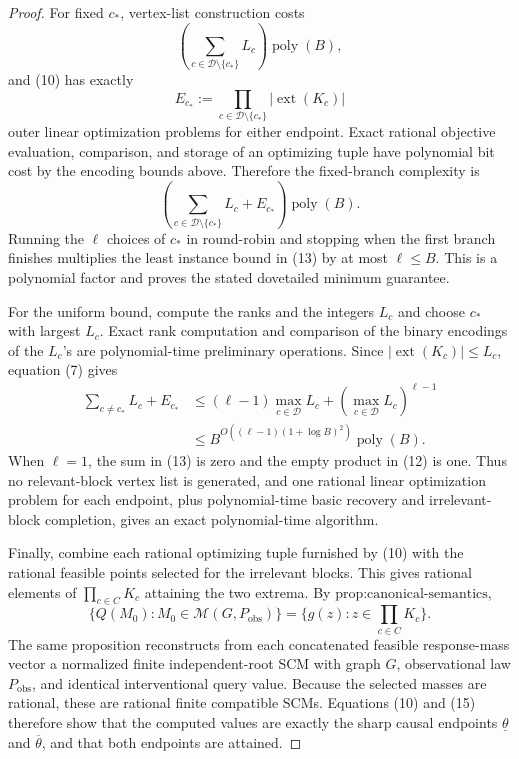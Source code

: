\documentclass{article}
\begin{document}
\begin{proof}
For fixed \(c_*\), vertex-list construction costs
\[
 \left(\sum_{c\in\mathcal D\setminus\{c_*\}}L_c\right)
 \operatorname{poly}(B),
 \tag{11}
\]
and (10) has exactly
\[
 E_{c_*}:=
 \prod_{c\in\mathcal D\setminus\{c_*\}}
 |\operatorname{ext}(K_c)|
 \tag{12}
\]
outer linear optimization problems for either endpoint.  Exact rational objective evaluation, comparison, and storage of an optimizing tuple have polynomial bit cost by the encoding bounds above.  Therefore the fixed-branch complexity is
\[
 \left(
 \sum_{c\in\mathcal D\setminus\{c_*\}}L_c+E_{c_*}
 \right)\operatorname{poly}(B).
 \tag{13}
\]
Running the \(\ell\) choices of \(c_*\) in round-robin and stopping when the first branch finishes multiplies the least instance bound in (13) by at most \(\ell\le B\).  This is a polynomial factor and proves the stated dovetailed minimum guarantee.

For the uniform bound, compute the ranks and the integers \(L_c\) and choose \(c_*\) with largest \(L_c\).  Exact rank computation and comparison of the binary encodings of the \(L_c\)'s are polynomial-time preliminary operations.  Since \(|\operatorname{ext}(K_c)|\le L_c\), equation (7) gives
\[
 \begin{aligned}
 \sum_{c\ne c_*}L_c+E_{c_*}
 &\le (\ell-1)\max_{c\in\mathcal D}L_c
      +\left(\max_{c\in\mathcal D}L_c\right)^{\ell-1}\\
 &\le B^{O((\ell-1)(1+\log B)^2)}\operatorname{poly}(B).
 \end{aligned}
 \tag{14}
\]
When \(\ell=1\), the sum in (13) is zero and the empty product in (12) is one.  Thus no relevant-block vertex list is generated, and one rational linear optimization problem for each endpoint, plus polynomial-time basic recovery and irrelevant-block completion, gives an exact polynomial-time algorithm.

Finally, combine each rational optimizing tuple furnished by (10) with the rational feasible points selected for the irrelevant blocks.  This gives rational elements of \(\prod_{c\in C}K_c\) attaining the two extrema.  By \(\text{prop:canonical-semantics}\),
\[
 \{Q(M_0):M_0\in\mathcal M(G,P_{\mathrm{obs}})\}
 =\{g(z):z\in\prod_{c\in C}K_c\}.
 \tag{15}
\]
The same proposition reconstructs from each concatenated feasible response-mass vector a normalized finite independent-root SCM with graph \(G\), observational law \(P_{\mathrm{obs}}\), and identical interventional query value.  Because the selected masses are rational, these are rational finite compatible SCMs.  Equations (10) and (15) therefore show that the computed values are exactly the sharp causal endpoints \(\underline\theta\) and \(\overline\theta\), and that both endpoints are attained.
\end{proof}
\end{document}
